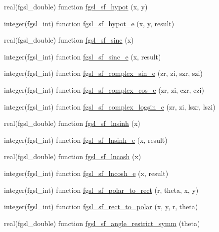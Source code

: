 \begin{DoxyCompactItemize}
real(fgsl\+\_\+double) function \hyperlink{specfunc_8finc_a0cb9cfebcedb5a689ad9bb56d410e829}{fgsl\+\_\+sf\+\_\+hypot} (x, y)
\item 
integer(fgsl\+\_\+int) function \hyperlink{specfunc_8finc_ade7cfa1350a14a8cf5435bd603a12cb0}{fgsl\+\_\+sf\+\_\+hypot\+\_\+e} (x, y, result)
\item 
real(fgsl\+\_\+double) function \hyperlink{specfunc_8finc_a5de6b8dace55d850a032754ef7c970f8}{fgsl\+\_\+sf\+\_\+sinc} (x)
\item 
integer(fgsl\+\_\+int) function \hyperlink{specfunc_8finc_a06fe56f01f7a54748213d698086b7c79}{fgsl\+\_\+sf\+\_\+sinc\+\_\+e} (x, result)
\item 
integer(fgsl\+\_\+int) function \hyperlink{specfunc_8finc_a796e7d0e3c831db7c7d4ec07aa6adee9}{fgsl\+\_\+sf\+\_\+complex\+\_\+sin\+\_\+e} (zr, zi, szr, szi)
\item 
integer(fgsl\+\_\+int) function \hyperlink{specfunc_8finc_a268d1473862e7d9ff7d46cf86b298db9}{fgsl\+\_\+sf\+\_\+complex\+\_\+cos\+\_\+e} (zr, zi, czr, czi)
\item 
integer(fgsl\+\_\+int) function \hyperlink{specfunc_8finc_acc1ca8d3cd2cadd0970408ffd4028569}{fgsl\+\_\+sf\+\_\+complex\+\_\+logsin\+\_\+e} (zr, zi, lszr, lszi)
\item 
real(fgsl\+\_\+double) function \hyperlink{specfunc_8finc_a4a161e72b8946f3d4745d5a2a00c4118}{fgsl\+\_\+sf\+\_\+lnsinh} (x)
\item 
integer(fgsl\+\_\+int) function \hyperlink{specfunc_8finc_a60a53c313477b372d770fbd1d649745b}{fgsl\+\_\+sf\+\_\+lnsinh\+\_\+e} (x, result)
\item 
real(fgsl\+\_\+double) function \hyperlink{specfunc_8finc_a119b7fc003b918daff467e93f5dfabf4}{fgsl\+\_\+sf\+\_\+lncosh} (x)
\item 
integer(fgsl\+\_\+int) function \hyperlink{specfunc_8finc_a468056cedb614e0479f0b72f7bd5d564}{fgsl\+\_\+sf\+\_\+lncosh\+\_\+e} (x, result)
\item 
integer(fgsl\+\_\+int) function \hyperlink{specfunc_8finc_a158890c3630914d2603572633ac07da1}{fgsl\+\_\+sf\+\_\+polar\+\_\+to\+\_\+rect} (r, theta, x, y)
\item 
integer(fgsl\+\_\+int) function \hyperlink{specfunc_8finc_a213288b2759873ac9d8f04e1bca141ab}{fgsl\+\_\+sf\+\_\+rect\+\_\+to\+\_\+polar} (x, y, r, theta)
\item 
real(fgsl\+\_\+double) function \hyperlink{specfunc_8finc_aa7d60325b186984c8cd117203d2ac494}{fgsl\+\_\+sf\+\_\+angle\+\_\+restrict\+\_\+symm} (theta)
\item 

\end{DoxyCompactItemize}
